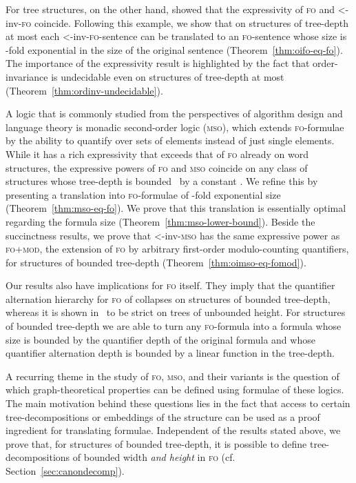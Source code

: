 \documentclass[11pt]{article}
\newcommand{\logic}[1]{\textsc{#1}}
\newcommand{\FO}{\logic{fo}}
\newcommand{\FOmod}{\logic{fo+mod}}
\newcommand{\MSO}{\logic{mso}}
\newcommand{\ordinv}[1]{\textnormal{{\small \textless}-inv-}#1}
\newcommand{\oiFO}{\ordinv{\FO{}}}
\newcommand{\oiMSO}{\ordinv{\MSO{}}}
\begin{document}
For tree structures, on the other hand, \cite{BenediktSegoufin2009} showed that
the expressivity of \FO{} and \oiFO{} coincide. Following this example, 
we show that on structures of tree-depth at most  each \oiFO{}-sentence can be translated to an \FO{}-sentence
whose size is -fold exponential in the size of the original sentence (Theorem~\ref{thm:oifo-eq-fo}). The importance of the expressivity result is
highlighted by the fact that order-invariance is undecidable even on structures
of tree-depth at most  (Theorem~\ref{thm:ordinv-undecidable}). 

A logic that is commonly studied from the perspectives of algorithm design and
language theory is monadic second-order logic (\MSO{}), which extends
\FO{}-formulae by the ability to quantify over sets of elements instead of just
single elements. While it has a rich expressivity that exceeds that of \FO{}
already on word structures, the expressive powers of \FO{} and \MSO{} coincide
on any class of structures whose tree-depth is bounded~\cite{ElberfeldGT12} by a constant . We
refine this by presenting a translation into \FO{}-formulae of -fold exponential size
(Theorem~\ref{thm:mso-eq-fo}). We prove that this translation is essentially optimal regarding the formula size
(Theorem~\ref{thm:mso-lower-bound}).
Beside the succinctness results, we prove that \oiMSO{} has the same
expressive power as \FOmod{}, the extension of \FO{} by arbitrary
first-order modulo-counting quantifiers, for structures of bounded tree-depth (Theorem~\ref{thm:oimso-eq-fomod}). 

Our results also have implications for \FO{} itself. They imply that the
quantifier alternation hierarchy for \FO{} of \cite{ChandraH1982} collapses on
structures of bounded tree-depth, whereas it is shown in~\cite{ChandraH1982} to
be strict on trees of unbounded height. For structures of bounded tree-depth we
are able to turn any \FO-formula into a formula whose size is bounded by the
quantifier depth of the original formula and whose quantifier alternation depth
is bounded by a linear function in the tree-depth.

A recurring theme in the study of \FO{}, \MSO{}, and their variants is the
question of which graph-theoretical properties can be defined using formulae of
these logics. The main motivation behind these questions lies in the fact that
access to certain tree-decompositions or embeddings of the structure can be used
as a proof ingredient for translating formulae. Independent of the results
stated above, we prove that, for structures of bounded tree-depth, it is
possible to define tree-decompositions of bounded width \emph{and height} in
\FO{} (cf. Section~\ref{sec:canondecomp}).
\end{document}
